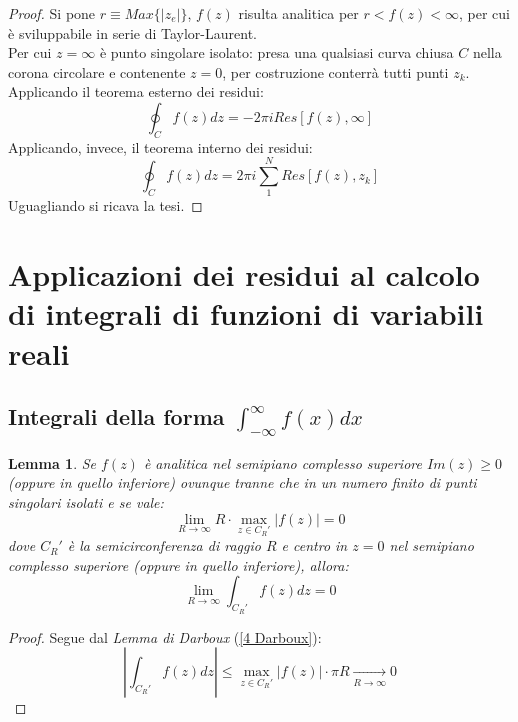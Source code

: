\documentclass[twoside]{article}
\newtheorem{lemma}[theorem]{Lemma}
\begin{document}
\begin{proof}
Si pone $r\equiv Max\{|z_e|\}$, $f(z)$ risulta analitica per $r<f(z)<\infty$, per cui è sviluppabile in serie di Taylor-Laurent.\\
Per cui $z=\infty$ è punto singolare isolato: presa una qualsiasi curva chiusa $C$ nella corona circolare e contenente $z=0$, per costruzione conterrà tutti punti $z_k$.\\
Applicando il teorema esterno dei residui:
\begin{equation}
    \oint_C f(z)dz=-2\pi i Res[f(z),\infty]
\end{equation}
Applicando, invece, il teorema interno dei residui:
\begin{equation}
    \oint_C f(z)dz=2\pi i\sum_1^N Res[f(z),z_k]
\end{equation}
Uguagliando si ricava la tesi.

\end{proof}

\newpage
\section{Applicazioni dei residui al calcolo di integrali di funzioni di variabili reali}

\subsection{Integrali della forma \texorpdfstring{$\int_{-\infty}^{\infty}f(x)dx$}{Lg}}
\begin{lemma} \label{bruh}
Se $f(z)$ è analitica nel semipiano complesso superiore $Im(z)\ge0$ (oppure in quello inferiore) ovunque tranne che in un numero finito di punti singolari isolati e se vale:
\begin{equation}
    \lim_{R\to \infty}R \cdot \max_{z\in C_R'}|f(z)|=0
\end{equation}
dove $C_R'$ è la semicirconferenza di raggio $R$ e centro in $z=0$ nel semipiano complesso superiore (oppure in quello inferiore), allora:
\begin{equation}
    \lim_{R\to \infty}\int_{C_R'}f(z)dz=0
\end{equation}
\end{lemma}

\begin{proof}
Segue dal \textit{Lemma di Darboux} (\ref{4 Darboux}):
\begin{equation}
    \left|\int_{C_R'}f(z)dz\right|\le \max_{z\in C_R'}|f(z)|\cdot \pi R \xrightarrow[R\to \infty] \ 0
\end{equation}
\end{proof}
\end{document}
